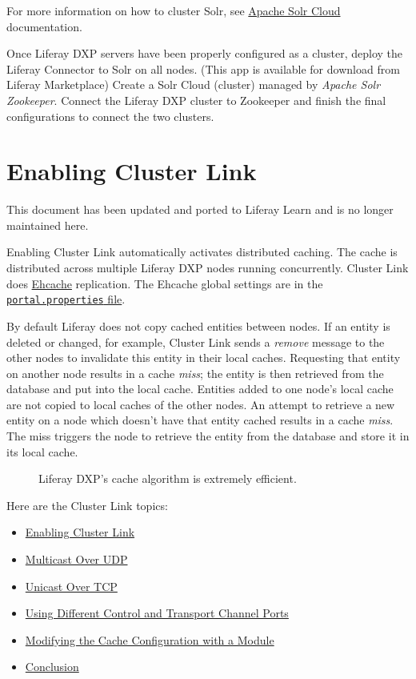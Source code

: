 For more information on how to cluster Solr, see
\href{https://cwiki.apache.org/confluence/display/solr/SolrCloud}{Apache
Solr Cloud} documentation.

Once Liferay DXP servers have been properly configured as a cluster,
deploy the Liferay Connector to Solr on all nodes. (This app is
available for download from Liferay Marketplace) Create a Solr Cloud
(cluster) managed by \emph{Apache Solr Zookeeper}. Connect the Liferay
DXP cluster to Zookeeper and finish the final configurations to connect
the two clusters.

\chapter{Enabling Cluster Link}\label{enabling-cluster-link}

{This document has been updated and ported to Liferay Learn and is no
longer maintained here.}

Enabling Cluster Link automatically activates distributed caching. The
cache is distributed across multiple Liferay DXP nodes running
concurrently. Cluster Link does \href{http://www.ehcache.org}{Ehcache}
replication. The Ehcache global settings are in the
\href{@platform-ref@/7.2-latest/propertiesdoc/portal.properties.html\#Ehcache}{\texttt{portal.properties}
file}.

By default Liferay does not copy cached entities between nodes. If an
entity is deleted or changed, for example, Cluster Link sends a
\emph{remove} message to the other nodes to invalidate this entity in
their local caches. Requesting that entity on another node results in a
cache \emph{miss}; the entity is then retrieved from the database and
put into the local cache. Entities added to one node's local cache are
not copied to local caches of the other nodes. An attempt to retrieve a
new entity on a node which doesn't have that entity cached results in a
cache \emph{miss}. The miss triggers the node to retrieve the entity
from the database and store it in its local cache.

\begin{figure}
\centering
{}
\caption{Liferay DXP's cache algorithm is extremely efficient.}
\end{figure}

Here are the Cluster Link topics:

\begin{itemize}
\tightlist
\item
  \hyperref[enabling-cluster-link]{Enabling Cluster Link}
\item
  \hyperref[multicast-over-udp]{Multicast Over UDP}
\item
  \hyperref[unicast-over-tcp]{Unicast Over TCP}
\item
  \hyperref[using-different-control-and-transport-channel-ports]{Using
  Different Control and Transport Channel Ports}
\item
  \hyperref[modifying-the-cache-configuration-with-a-module]{Modifying
  the Cache Configuration with a Module}
\item
  \hyperref[conclusion]{Conclusion}
\end{itemize}

